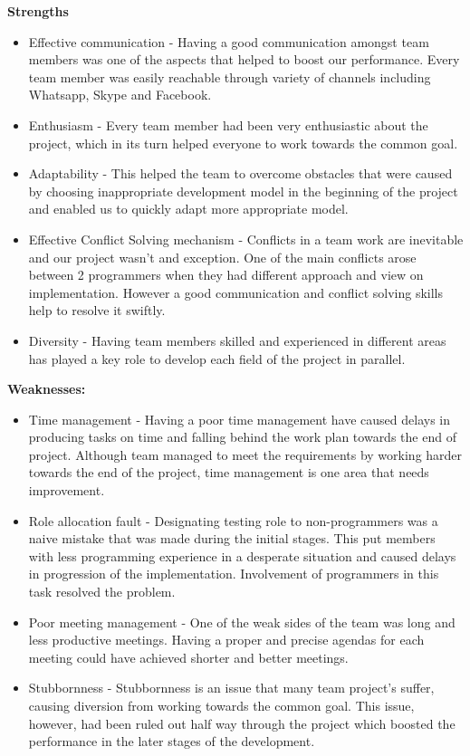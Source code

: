 \textbf{Strengths}
\begin{itemize}
\item Effective communication - Having a good communication amongst team members was one of the aspects that helped to boost our performance. Every team member was easily reachable through variety of channels including Whatsapp, Skype and Facebook. 
\item Enthusiasm -  Every team member had been very enthusiastic about the project, which in its turn helped everyone to work towards the common goal.
\item Adaptability - This helped the team to overcome obstacles that were caused by choosing inappropriate development model in the beginning of the project and enabled us to quickly adapt more appropriate model.
\item Effective Conflict Solving mechanism - Conflicts in a team work are inevitable and our project wasn't and exception. One of the main conflicts arose between 2 programmers when they had different approach and view on implementation. However a good communication and conflict solving skills help to resolve it swiftly.
\item Diversity - Having team members skilled and experienced in different areas has played a key role to develop each field of the project in parallel.
\end{itemize}  


\textbf{Weaknesses:}
\begin{itemize}
\item Time management -  Having a poor time management have caused delays in producing tasks on time and falling behind the work plan towards the end of project. Although team managed to meet the requirements by working harder towards the end of the project, time management is one area that needs improvement.
\item Role allocation fault - Designating testing role to non-programmers was a naive mistake that was made during the initial stages. This put members with less programming experience in a desperate situation and caused delays in progression of the implementation. Involvement of programmers in this task resolved the problem.
\item Poor meeting management -  One of the weak sides of the team was long and less productive meetings. Having a proper and precise agendas for each meeting could have achieved shorter and better meetings.
\item Stubbornness - Stubbornness is an issue that many team project's suffer, causing diversion from working towards the common goal. This issue, however, had been ruled out half way through the project which boosted the performance in the later stages of the development.
\end{itemize}  

